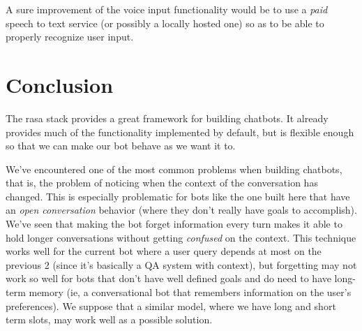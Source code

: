 \documentclass[11pt,a4paper]{article}
\begin{document}
	A sure improvement of the voice input functionality would be to use a \textit{paid} speech to text service (or possibly a locally hosted one) so as to be able to properly recognize user input.

\section{Conclusion}
\label{sec-conclusion}
	
	The rasa stack provides a great framework for building chatbots. It already provides much of the functionality implemented by default, but is flexible enough so that we can make our bot behave as we want it to. 
	
	We've encountered one of the most common problems when building chatbots, that is, the problem of noticing when the context of the conversation has changed. This is especially problematic for bots like the one built here that have an \textit{open conversation} behavior (where they don't really have goals to accomplish). We've seen that making the bot forget information every turn makes it able to hold longer conversations without getting \textit{confused} on the context. This technique works well for the current bot where a user query depends at most on the previous 2 (since it's basically a QA system with context), but forgetting may not work so well for bots that don't have well defined goals and do need to have long-term memory (ie, a conversational bot that remembers information on the user's preferences). We suppose that a similar model, where we have long and short term slots, may work well as a possible solution. 
	



%

%


%
\end{document}

